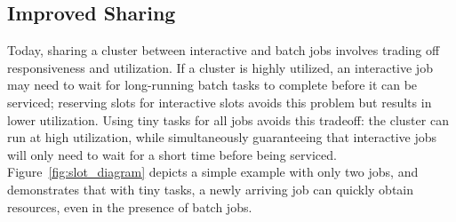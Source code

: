 \subsection{Improved Sharing}
Today, sharing a cluster between interactive and batch jobs involves trading off
responsiveness and utilization. If a cluster is highly utilized,
an interactive job may need to wait for long-running batch tasks to
complete before it can be serviced; reserving slots for
interactive slots avoids this problem but results in lower utilization.
Using tiny tasks for all jobs avoids this tradeoff: the cluster can run at
high utilization, while
simultaneously guaranteeing that interactive jobs will only need to wait for
a short time before being serviced. Figure~\ref{fig:slot_diagram} depicts a simple example
with only two jobs, and demonstrates that with tiny tasks, a newly arriving
job can quickly obtain resources, even in the presence
of batch jobs.
